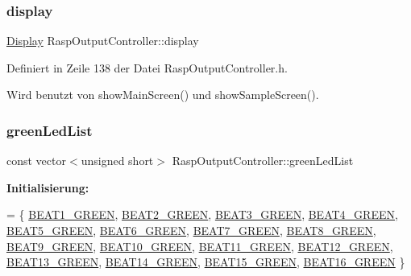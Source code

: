 \mbox{\label{class_rasp_output_controller_a0bb52cfee18c44cd2ed64dea27d5ccc4}} 
\subsubsection{\texorpdfstring{display}{display}}
{\footnotesize\ttfamily \hyperlink{class_display}{Display} Rasp\+Output\+Controller\+::display\hspace{0.3cm}{\ttfamily [private]}}



Definiert in Zeile 138 der Datei Rasp\+Output\+Controller.\+h.



Wird benutzt von show\+Main\+Screen() und show\+Sample\+Screen().

\mbox{\label{class_rasp_output_controller_a8b888abfd8719eb95568abaf53d68d5c}} 
\subsubsection{\texorpdfstring{green\+Led\+List}{greenLedList}}
{\footnotesize\ttfamily const vector$<$unsigned short$>$ Rasp\+Output\+Controller\+::green\+Led\+List\hspace{0.3cm}{\ttfamily [private]}}

{\bfseries Initialisierung\+:}
\begin{DoxyCode}
= \{
            \hyperlink{namespaceoutputs_ad934b2db0cff1421ca84b300dc257508}{BEAT1\_GREEN}, \hyperlink{namespaceoutputs_ad2dc5e7bf8fd1c9ffa64cf8efdb0035a}{BEAT2\_GREEN}, \hyperlink{namespaceoutputs_a95e392d21973d605abcc9efc19dce314}{BEAT3\_GREEN}, 
      \hyperlink{namespaceoutputs_afd9270436632213bade739dbc4f6c8f6}{BEAT4\_GREEN}, \hyperlink{namespaceoutputs_a4b1e0d3ad2b80752a68cdec9a73f5ac6}{BEAT5\_GREEN}, \hyperlink{namespaceoutputs_a55c3bd8cf6cdffbd199abc9ae5a0e1ac}{BEAT6\_GREEN}, 
      \hyperlink{namespaceoutputs_a971ea0c6742c83be5634cbf533cfb050}{BEAT7\_GREEN}, \hyperlink{namespaceoutputs_a6fe56e04e6ce7835262e2a60df0506d6}{BEAT8\_GREEN},
            \hyperlink{namespaceoutputs_a0600b91e575643cfee3eb9e9e5b14839}{BEAT9\_GREEN}, \hyperlink{namespaceoutputs_ab0b662f329ea65f6f5fc1acba70fbd07}{BEAT10\_GREEN}, \hyperlink{namespaceoutputs_a38945c3c9766ee86e3c97a79e2be45c1}{BEAT11\_GREEN}, 
      \hyperlink{namespaceoutputs_a863de14249bb5dd32b6fb2dd665f804e}{BEAT12\_GREEN}, \hyperlink{namespaceoutputs_a3410f51b9ac465ad73e71e8bd54b3ab4}{BEAT13\_GREEN}, \hyperlink{namespaceoutputs_a181a1c13a2964de30df1c57bae8f8428}{BEAT14\_GREEN}, 
      \hyperlink{namespaceoutputs_afacd3fd74ab006d3ce548b672c3ab2f7}{BEAT15\_GREEN},
            \hyperlink{namespaceoutputs_abb8efcc194a9934c26026a359edc8929}{BEAT16\_GREEN}
    \}
\end{DoxyCode}


